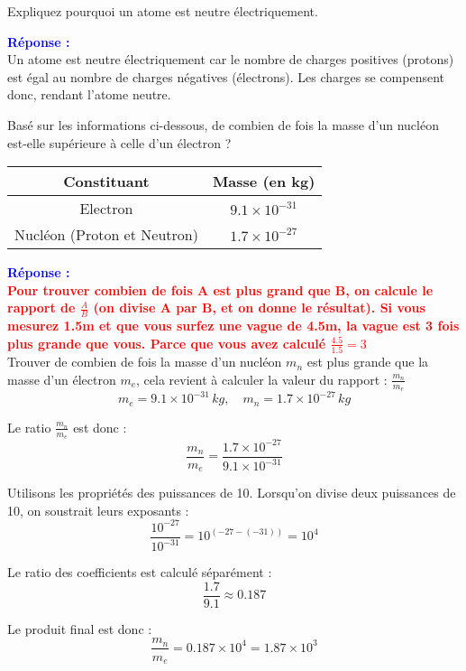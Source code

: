 \documentclass{exam}
\begin{document}
\begin{questions}
  \question[0.5] Expliquez pourquoi un atome est neutre électriquement.

  \textbf{\textcolor{blue}{Réponse :}} \\
  Un atome est neutre électriquement car le nombre de charges positives (protons) est égal au nombre de charges négatives (électrons). Les charges se compensent donc, rendant l’atome neutre.

  \question[1.5] Basé sur les informations ci-dessous, de combien de fois la masse d’un nucléon est-elle supérieure à celle d’un électron ? 

  \begin{center}
    \begin{tabular}{SS}
      \toprule
      {Constituant} & {Masse (en \si{kg})} \\
      \midrule
      {Electron} & {\(9.1 \times 10^{-31}\)} \\
      {Nucléon (Proton et Neutron)} & {\(1.7 \times 10^{-27}\)} \\
      \bottomrule
    \end{tabular}
  \end{center}
    

  \textbf{\textcolor{blue}{Réponse :}} \\
  \textbf{\textcolor{red}{Pour trouver combien de fois A est plus grand que B, on calcule le rapport de $\frac{A}{B}$ (on divise A par B, et on donne le résultat). Si vous mesurez 1.5m et que vous surfez une vague de 4.5m, la vague est 3 fois plus grande que vous. Parce que vous avez calculé $\frac{4.5}{1.5} = 3$}} \\
  \vspace{1em}
  Trouver de combien de fois la masse d'un nucléon $m_n$ est plus grande que la masse d'un électron $m_e$, cela revient à calculer la valeur du rapport : $\frac{m_n}{m_e}$
\[
m_e = 9.1 \times 10^{-31} \, \si{kg}, \quad m_n = 1.7 \times 10^{-27} \, \si{kg}
\]

Le ratio \(\frac{m_n}{m_e}\) est donc :
\[
\frac{m_n}{m_e} = \frac{1.7 \times 10^{-27}}{9.1 \times 10^{-31}}
\]

Utilisons les propriétés des puissances de 10. Lorsqu'on divise deux puissances de 10, on soustrait leurs exposants :
\[
\frac{10^{-27}}{10^{-31}} = 10^{(-27 - (-31))} = 10^{4}
\]

Le ratio des coefficients est calculé séparément :
\[
\frac{1.7}{9.1} \approx 0.187
\]

Le produit final est donc :
\[
\frac{m_n}{m_e} = 0.187 \times 10^4 = 1.87 \times 10^3
\]


\end{questions}
\end{document}
